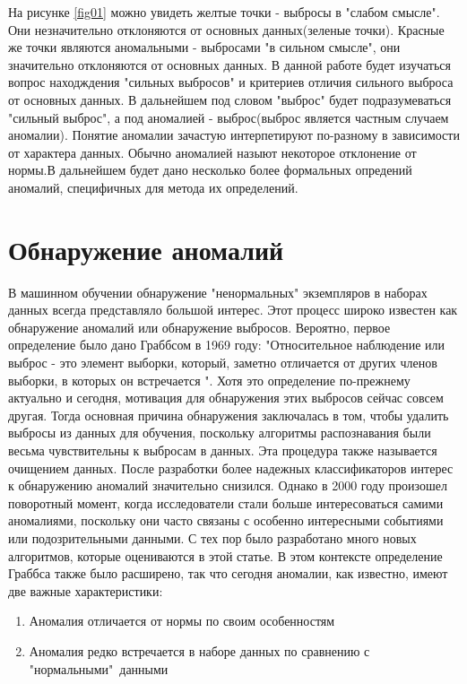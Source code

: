 На рисунке \ref{fig01} можно увидеть желтые точки - выбросы в "слабом смысле". Они незначительно отклоняются от основных данных(зеленые точки). Красные же точки являются аномальными - выбросами "в сильном смысле", они значительно  отклоняются  от основных данных. В данной работе будет изучаться вопрос находждения "сильных выбросов" и  критериев отличия сильного выброса от основных данных. В дальнейшем под словом "выброс" будет подразумеваться "сильный выброс",  а под  аномалией -  выброс(выброс является частным случаем аномалии).
Понятие аномалии зачастую интерпетируют по-разному в зависимости от характера данных. Обычно аномалией назыют некоторое отклонение от нормы.В дальнейшем будет дано несколько более формальных опредений аномалий, специфичных для метода их определений.

\section{Обнаружение аномалий}
В машинном обучении обнаружение  "ненормальных" экземпляров в наборах данных всегда представляло большой интерес. Этот процесс широко известен как обнаружение аномалий или обнаружение выбросов.  Вероятно, первое определение было дано Граббсом\cite{Book02} в 1969 году: "Относительное наблюдение или выброс - это элемент выборки, который, заметно отличается от других членов выборки, в которых он встречается ".
Хотя это определение по-прежнему актуально и сегодня, мотивация для обнаружения этих выбросов сейчас совсем другая. Тогда основная причина обнаружения заключалась в том, чтобы удалить выбросы из данных для обучения, поскольку алгоритмы распознавания  были весьма чувствительны к выбросам в данных. Эта процедура также называется очищением данных. После разработки более надежных классификаторов интерес к обнаружению аномалий значительно снизился. Однако в 2000 году произошел поворотный момент, когда исследователи стали больше интересоваться самими аномалиями, поскольку они часто связаны с особенно интересными событиями или подозрительными данными. С тех пор было разработано много новых алгоритмов, которые оцениваются в этой статье. В этом контексте определение Граббса также было расширено, так что сегодня аномалии, как известно, имеют две важные характеристики:
\begin{enumerate}
	\item Аномалия отличается от нормы по своим особенностям
	\item Аномалия редко встречается в наборе данных по сравнению с "нормальными"\  данными
\end{enumerate}
